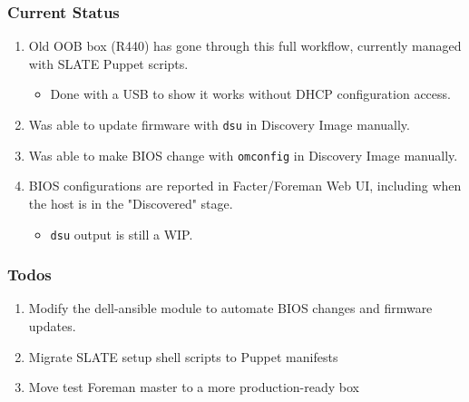\documentclass{beamer}
\begin{document}
\begin{frame}
	\frametitle{Current Status}
	\begin{enumerate}
		\item Old OOB box (R440) has gone through this full workflow, currently managed with SLATE Puppet scripts.
		      \begin{itemize}
			      \item Done with a USB to show it works without DHCP configuration access.
		      \end{itemize}
		\item Was able to update firmware with \texttt{dsu} in Discovery Image manually.
		\item Was able to make BIOS change with \texttt{omconfig} in Discovery Image manually.
		\item BIOS configurations are reported in Facter/Foreman Web UI, including when the host is in the "Discovered" stage.
		      \begin{itemize}
			      \item \texttt{dsu} output is still a WIP.
		      \end{itemize}
	\end{enumerate}

\end{frame}

\begin{frame}
	\frametitle{Todos}
	\begin{enumerate}
		\item Modify the dell-ansible module to automate BIOS changes and firmware updates.
		\item Migrate SLATE setup shell scripts to Puppet manifests
		\item Move test Foreman master to a more production-ready box
	\end{enumerate}

\end{frame}
\end{document}
